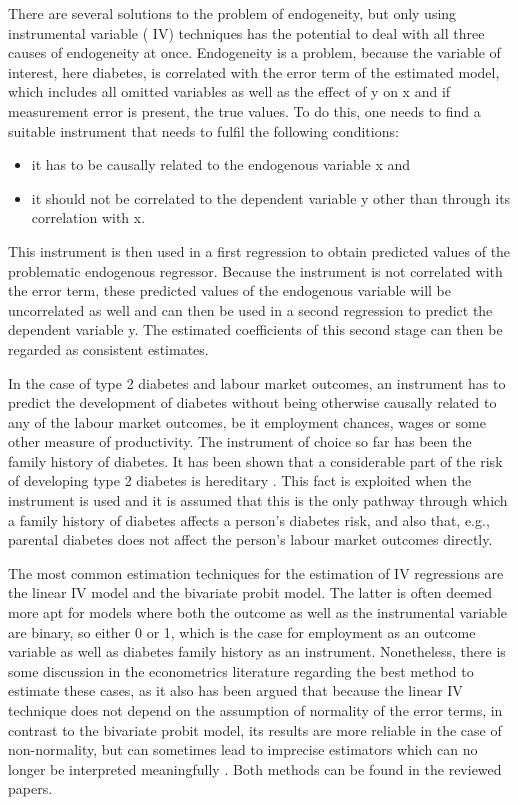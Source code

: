 \documentclass[12pt,english]{article}
\begin{document}
\begin{appendix}
There are several solutions to the problem of endogeneity, but only using instrumental variable ( \ac{IV}) techniques has the potential to deal with all three causes of endogeneity at once. Endogeneity is a problem, because the variable of interest, here diabetes, is correlated with the error term of the estimated model, which includes all omitted variables as well as the effect of y on x and if measurement error is present, the true values. To do this, one needs to find a suitable instrument that needs to fulfil the following conditions:
\begin{itemize}
\item	it has to be causally related to the endogenous variable x and
\item	it should not be correlated to the dependent variable y other than through its correlation with x.
\end{itemize}
This instrument is then used in a first regression to obtain predicted values of the problematic endogenous regressor. Because the instrument is not correlated with the error term, these predicted values of the endogenous variable will be uncorrelated as well and can then be used in a second regression to predict the dependent variable y. The estimated coefficients of this second stage can then be regarded as consistent estimates.

In the case of type 2 diabetes and labour market outcomes, an instrument has to predict the development of diabetes without being otherwise causally related to any of the labour market outcomes, be it employment chances, wages or some other measure of productivity. The instrument of choice so far has been the family history of diabetes. It has been shown that a considerable part of the risk of developing type 2 diabetes is hereditary \parencite{Herder2011,Hemminki2010,TheInteractConsortium2013}. This fact is exploited when the instrument is used and it is assumed that this is the only pathway through which a family history of diabetes affects a person's diabetes risk, and also that, e.g., parental diabetes does not affect the person's labour market outcomes directly.

The most common estimation techniques for the estimation of \ac{IV} regressions are the linear \ac{IV} model and the bivariate probit model. The latter is often deemed more apt for models where both the outcome as well as the instrumental variable are binary, so either 0 or 1, which is the case for employment as an outcome variable as well as diabetes family history as an instrument. Nonetheless, there is some discussion in the econometrics literature regarding the best method to estimate these cases, as it also has been argued that because the linear \ac{IV} technique does not depend on the assumption of normality of the error terms, in contrast to the bivariate probit model, its results are more reliable in the case of non-normality, but can sometimes lead to imprecise estimators which can no longer be interpreted meaningfully \parencite{Chiburis2012}. Both methods can be found in the reviewed papers.


\end{appendix}
\end{document}

